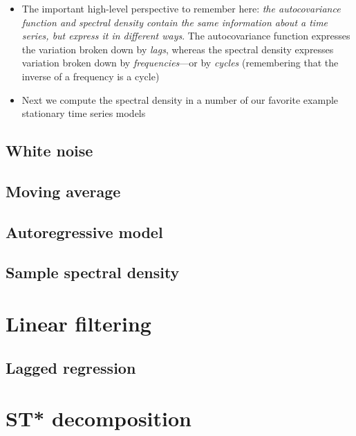 \documentclass{article}
\begin{document}
\begin{itemize}
\item The important high-level perspective to remember here: \emph{the
    autocovariance function and spectral density contain the same information
    about a time series, but express it in different ways}. The autocovariance 
  function expresses the variation broken down by \emph{lags}, whereas the
  spectral density expresses variation broken down by \emph{frequencies}---or by
  \emph{cycles} (remembering that the inverse of a frequency is a cycle) 

\item Next we compute the spectral density in a number of our favorite example
  stationary time series models 
\end{itemize}

\subsection{White noise}

\subsection{Moving average}

\subsection{Autoregressive model}

\subsection{Sample spectral density}

\section{Linear filtering}

\subsection{Lagged regression}

\section{ST* decomposition}
\end{document}
